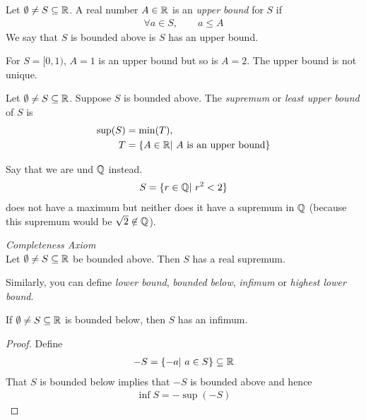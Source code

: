 \begin{df}
	Let $\emptyset \neq S \subseteq \mathbb R$. A real number $A \in \mathbb R$ is an \emph{upper bound} for $S$ if
	\begin{align*}
	\forall a \in S, \qquad a \le A
	\end{align*}
	We say that $S$ is bounded above is $S$ has an upper bound.
\end{df}

\begin{rk}
	For $S = [0,1)$, $A=1$ is an upper bound but so is $A=2$. The upper bound is not unique.
\end{rk}

\begin{df}
	Let $\emptyset \neq S \subseteq \mathbb R$. Suppose $S$ is bounded above. The \emph{supremum} or \emph{least upper bound} of $S$ is
	\begin{align*}
	\sup (S) & = \min (T), \\
	T & = \{ A \in \mathbb R| ~ A~ \text{is an upper bound} \}
	\end{align*}
\end{df}

\begin{ex}
	Say that we are und $\mathbb Q$ instead.
	\begin{align*}
	S = \{ r \in \mathbb Q | ~r^2<2 \}
	\end{align*}
	does not have a maximum but neither does it have a supremum in $\mathbb Q$ (because this supremum would be $\sqrt 2 \not \in \mathbb Q$).
\end{ex}

\begin{ax}
	\emph{Completeness Axiom} \\
	Let $\emptyset \neq S \subseteq \mathbb R$ be bounded above. Then $S$ has a real supremum.
\end{ax}

Similarly, you can define \emph{lower bound}, \emph{bounded below}, \emph{infimum} or \emph{highest lower bound}.

\begin{rt}
	If $\emptyset \neq S \subseteq \mathbb R$ is bounded below, then 
	$S$ has an infimum.
\end{rt}

\begin{proof}
	Define
	\begin{align*}
	- S = \{-a | ~ a \in S \} \subseteq \mathbb R
	\end{align*}
	That $S$ is bounded below implies that $-S$ is bounded above and hence
	\begin{align*}
	\inf S = - \sup(-S)
	\end{align*}
\end{proof}



